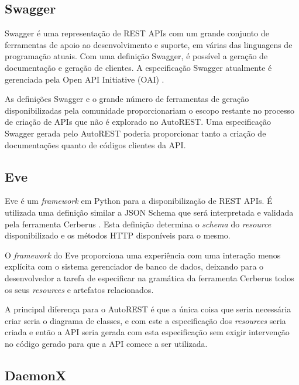 \subsection{Swagger}

Swagger \cite{SWAGGER} é uma representação de REST APIs com um grande conjunto de ferramentas de apoio ao desenvolvimento e suporte, em várias das linguagens de programação atuais. Com uma definição Swagger, é possível a geração de documentação e geração de clientes. A especificação Swagger atualmente é gerenciada pela Open API Initiative (OAI) \cite{OpenAPII}.

As definições Swagger e o grande número de ferramentas de geração disponibilizadas pela comunidade proporcionariam o escopo restante no processo de criação de APIs que não é explorado no AutoREST. Uma especificação Swagger gerada pelo AutoREST poderia proporcionar tanto a criação de documentações quanto de códigos clientes da API.


\subsection{Eve}

Eve \cite{IAROCCI:EVE} é um \textit{framework} em Python para a disponibilização de REST APIs. É utilizada uma definição similar a JSON Schema que será interpretada e validada pela ferramenta Cerberus \cite{IAROCCI:CERBERUS}. Esta definição determina o \textit{schema} do \textit{resource} disponibilizado e os métodos HTTP disponíveis para o mesmo.

O \textit{framework} do Eve proporciona uma experiência com uma interação menos explícita com o sistema gerenciador de banco de dados, deixando para o desenvolvedor a tarefa de especificar na gramática da ferramenta Cerberus todos os seus \textit{resources} e artefatos relacionados.

A principal diferença para o AutoREST é que a única coisa que seria necessária criar seria o diagrama de classes, e com este a especificação dos \textit{resources} seria criada e então a API seria gerada com esta especificação sem exigir intervenção no código gerado para que a API comece a ser utilizada.


\subsection{DaemonX}

